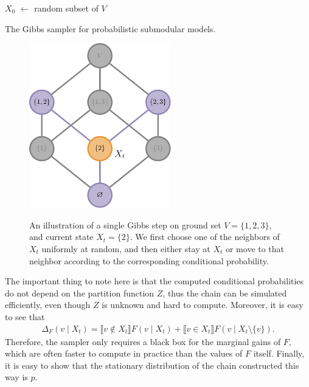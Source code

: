 \begin{algorithm}[tb]
    \DontPrintSemicolon
	$X_0$ $\gets$ random subset of $V$\\
    \vspace{1em}
	\caption{The Gibbs sampler for probabilistic submodular models.}
	\label{alg:gibbs}
\end{algorithm}

\begin{figure}[htb]
\centering
\includegraphics[width=0.55\textwidth]{figures/gibbs/lattice_gibbs_2.pdf}\\[1em]
\caption{An illustration of a single Gibbs step on ground set $V = \{1, 2, 3\}$, and current state $X_t = \{2\}$.
We first choose one of the neighbors of $X_t$ uniformly at random, and then either stay at $X_t$ or move to that neighbor according to the corresponding conditional probability.}
\label{fig:gibbs}
\end{figure}

The important thing to note here is that the computed conditional probabilities do not depend on the partition function $Z$, thus the chain can be simulated efficiently, even though $Z$ is unknown and hard to compute.
Moreover, it is easy to see that
\begin{align*}
\Delta_F(v \mid X_t) = \llbracket v\not\in X_t\rrbracket F(v \mid X_t) + \llbracket v\in X_t\rrbracket F(v \mid X_t\setminus\{v\}).
\end{align*}
Therefore, the sampler only requires a black box for the marginal gains of $F$, which are often faster to compute in practice than the values of $F$ itself.
Finally, it is easy to show that the stationary distribution of the chain constructed this way is $p$.

